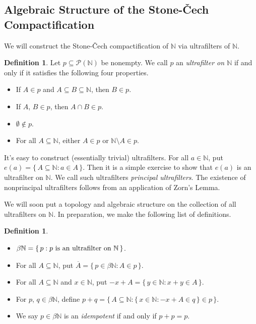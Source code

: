 \documentclass[12pt]{article}
\theoremstyle{plain}
\theoremstyle{definition}
\newtheorem{defn}[thm]{Definition}
\newcommand{\bbN}{\mathbb{N}}
\begin{document}
\subsection{Algebraic Structure of the Stone-\v{C}ech Compactification}
We will construct the Stone-\v{C}ech compactification of $\bbN$ via
ultrafilters of $\bbN$.
  \begin{defn}
    Let $p \subseteq \mathcal{P}(\bbN)$ be nonempty.
    We call $p$ an \textsl{ultrafilter on $\bbN$} if and only if it
    satisfies the following four properties.
      \begin{itemize}
        \item[(1)] If $A \in p$ and $A \subseteq B \subseteq \bbN$,
          then $B \in p$.
        \item[(2)] If $A$, $B \in p$, then $A \cap B \in p$.
        \item[(3)] $\emptyset \not\in p$.
        \item[(4)] For all $A \subseteq \bbN$, either $A \in p$ or
          $\bbN \setminus A \in p$.
      \end{itemize}
  \end{defn}
It's easy to construct (essentially trivial) ultrafilters. 
For all $a \in \bbN$, put $e(a) = \{\, A \subseteq \bbN : a \in A
\,\}$.
Then it is a simple exercise to show that $e(a)$ is an ultrafilter on
$\bbN$. 
We call such ultrafilters \textsl{principal ultrafilters}. 
The existence of nonprincipal ultrafilters follows from an application
of Zorn's Lemma. 

We will soon put a topology and algebraic structure on the collection
of all ultrafilters on $\bbN$. 
In preparation, we make the following list of definitions.

  \begin{defn}
    \begin{itemize}
      \item[(a)] $\beta\bbN = \{\, p : \hbox{$p$ is an ultrafilter on
          $\bbN$} \,\}$.
      \item[(b)] For all $A \subseteq \bbN$, put $\overline{A} = \{\,
        p \in \beta\bbN : A \in p \,\}$.
      \item[(c)] For all $A \subseteq \bbN$ and $x \in \bbN$, put
        $-x+A = \{\, y \in \bbN : x+y \in A \,\}$.
      \item[(d)] For $p$, $q \in \beta\bbN$, define
        $p+q = \bigl\{\, A \subseteq \bbN : \{\, x \in \bbN : -x +A \in q
        \,\} \in p \,\bigr\}$.
      \item[(e)] We say $p \in \beta\bbN$ is an \textsl{idempotent} if
        and only if $p + p = p$.
    \end{itemize}
  \end{defn}
\end{document}
